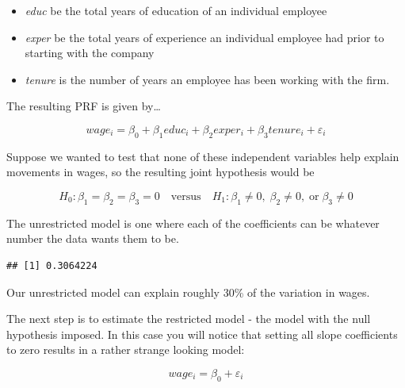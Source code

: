 \documentclass[
]{book}
\newenvironment{Shaded}{\begin{snugshade}}{\end{snugshade}}
\newcommand{\AttributeTok}[1]{\textcolor[rgb]{0.13,0.29,0.53}{#1}}
\newcommand{\FunctionTok}[1]{\textcolor[rgb]{0.13,0.29,0.53}{\textbf{#1}}}
\newcommand{\NormalTok}[1]{#1}
\newcommand{\OtherTok}[1]{\textcolor[rgb]{0.56,0.35,0.01}{#1}}
\newcommand{\SpecialCharTok}[1]{\textcolor[rgb]{0.81,0.36,0.00}{\textbf{#1}}}
\newcommand{\StringTok}[1]{\textcolor[rgb]{0.31,0.60,0.02}{#1}}
\begin{document}
\begin{itemize}
\item
  \emph{educ} be the total years of education of an individual employee
\item
  \emph{exper} be the total years of experience an individual employee had prior to starting with the company
\item
  \emph{tenure} is the number of years an employee has been working with the firm.
\end{itemize}

The resulting PRF is given by\ldots{}

\[wage_i=\beta_0+\beta_1educ_i+\beta_2exper_i+\beta_3tenure_i+\varepsilon_i\]

Suppose we wanted to test that none of these independent variables help explain movements in wages, so the resulting joint hypothesis would be

\[H_0: \beta_1 = \beta_2 = \beta_3 = 0 \quad \text{versus} \quad H_1: \beta_1 \neq 0, \; \beta_2 \neq 0, \; \text{or} \; \beta_3 \neq 0\]

The unrestricted model is one where each of the coefficients can be whatever number the data wants them to be.

\begin{Shaded}
\end{Shaded}

\begin{verbatim}
## [1] 0.3064224
\end{verbatim}

Our unrestricted model can explain roughly 30\% of the variation in wages.

The next step is to estimate the restricted model - the model with the null hypothesis imposed. In this case you will notice that setting all slope coefficients to zero results in a rather strange looking model:

\[wage_i=\beta_0+\varepsilon_i\]
\end{document}

